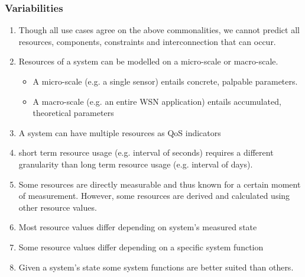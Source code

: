 \subsubsection{Variabilities}
\begin{enumerate}[label=V\rdmid .\arabic*]
\item \label{v:1obvious} Though all use cases agree on the above commonalities, we cannot predict all resources, components, constraints and interconnection that can occur.
\item \label{v:2micro_macro} Resources of a system can be modelled on a micro-scale or macro-scale.
\begin{itemize}
\item A micro-scale (e.g. a single sensor) entails concrete, palpable parameters.
\item A macro-scale (e.g. an entire WSN application) entails accumulated, theoretical parameters
\end{itemize}
\item \label{v:3nr_optimizer} A system can have multiple resources as QoS indicators
\item \label{v:4granularity} short term resource usage (e.g. interval of seconds) requires a different granularity than long term resource usage (e.g. interval of days).
\item \label{v:5measure_vs_derive} Some resources are directly measurable and thus known for a certain moment of measurement. However, some resources are derived and calculated using other resource values. \cite{feature_model}
\item \label{v:6state} Most resource values differ depending on system's measured state
\item \label{v:7function} Some resource values differ depending on a specific system function
\item \label{v:8rum} Given a system's state some system functions are better suited than others.
\end{enumerate}


